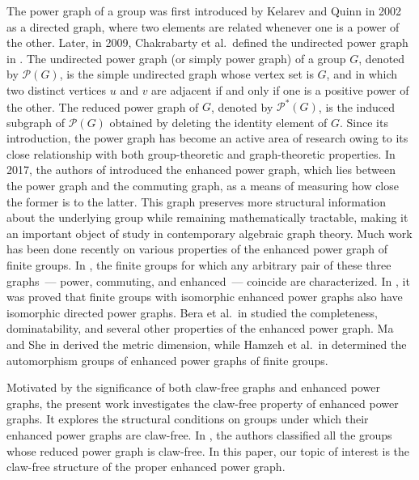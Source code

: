 \documentclass[preprint,11pt]{elsarticle}
\begin{document}
The power graph of a group was first introduced by Kelarev and Quinn in 2002 
as a directed graph, where two elements are related whenever one is a power 
of the other. Later, in 2009, Chakrabarty et al.\ defined the undirected 
power graph in \cite{undpwrgraphofsemgmainsgc1}. The undirected power graph 
(or simply power graph) of a group $G$, denoted by $\mathcal{P}(G)$, is the 
simple undirected graph whose vertex set is $G$, and in which two distinct 
vertices $u$ and $v$ are adjacent if and only if one is a positive power of 
the other. The reduced power graph of $G$, denoted by $\mathcal{P}^{*}(G)$, 
is the induced subgraph of $\mathcal{P}(G)$ obtained by deleting the identity 
element of $G$. Since its introduction, the power graph has become an active 
area of research owing to its close relationship with both group-theoretic 
and graph-theoretic properties. In 2017, the authors of 
\cite{firstenhcedpwrstrctreaacns1} introduced the enhanced power graph, which 
lies between the power graph and the commuting graph, as a means of measuring 
how close the former is to the latter.
This graph preserves more structural information about the underlying group 
while remaining mathematically tractable, making it an important object of 
study in contemporary algebraic graph theory. Much work has been done 
recently on various properties of the enhanced power graph of finite groups. 
In \cite{firstenhcedpwrstrctreaacns1}, the finite groups for which any 
arbitrary pair of these three graphs~--- power, commuting, and enhanced~--- 
coincide are characterized. In \cite{Zahirovienhnacedpwrgraph}, it was proved 
that finite groups with isomorphic enhanced power graphs also have isomorphic 
directed power graphs. Bera et al.\ in \cite{enhancedpwrgrapbb3} studied the 
completeness, dominatability, and several other properties of the enhanced 
power graph. Ma and She in \cite{ma-she} derived the metric dimension, while 
Hamzeh et al.\ in \cite{Hamzeh-ashrafi} determined the automorphism groups 
of enhanced power graphs of finite groups.

Motivated by the significance of both claw-free graphs and enhanced power graphs, the present work investigates the claw-free property of enhanced power graphs. It explores the structural conditions on groups under which their enhanced power graphs are claw-free. In \cite{claw-free-pwr-graph}, the authors classified all the groups whose reduced power graph is claw-free. 
 In this paper, our topic of interest is the claw-free structure of the proper enhanced power graph. 
\end{document}
